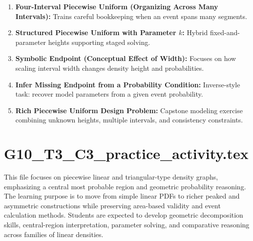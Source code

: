 \begin{enumerate}
  \item \textbf{Four-Interval Piecewise Uniform (Organizing Across Many Intervals):} Trains careful bookkeeping when an event spans many segments.
  \item \textbf{Structured Piecewise Uniform with Parameter \(k\):} Hybrid fixed-and-parameter heights supporting staged solving.
  \item \textbf{Symbolic Endpoint (Conceptual Effect of Width):} Focuses on how scaling interval width changes density height and probabilities.
  \item \textbf{Infer Missing Endpoint from a Probability Condition:} Inverse-style task: recover model parameters from a given event probability.
  \item \textbf{Rich Piecewise Uniform Design Problem:} Capstone modeling exercise combining unknown heights, multiple intervals, and consistency constraints.
\end{enumerate}

\section{G10\_T3\_C3\_practice\_activity.tex}
This file focuses on piecewise linear and triangular-type density graphs, emphasizing a central most probable region and geometric probability reasoning. The learning purpose is to move from simple linear PDFs to richer peaked and asymmetric constructions while preserving area-based validity and event calculation methods. Students are expected to develop geometric decomposition skills, central-region interpretation, parameter solving, and comparative reasoning across families of linear densities.

